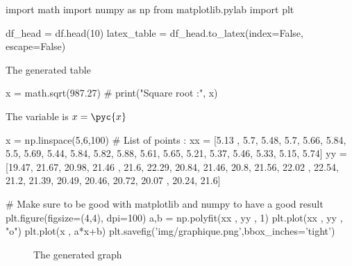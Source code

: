 \documentclass[11pt]{article}%
\begin{document}
\begin{pycode}
import math
import numpy as np
from matplotlib.pylab import plt    
\end{pycode}


\begin{pycode}
df_head = df.head(10)
latex_table = df_head.to_latex(index=False, escape=False)
\end{pycode}
    
\begin{table}
\centering
{}
\caption{The generated table}
\end{table}


\begin{pycode}
x = math.sqrt(987.27)
# print("Square root :",  x)
\end{pycode}

\vspace{5em}

The variable is $x=\pyc{x}$


\begin{pycode}
x = np.linspace(5,6,100)
# List of points :
xx = [5.13 , 5.7, 5.48, 5.7, 5.66, 5.84, 5.5, 5.69, 5.44, 5.84, 5.82, 5.88, 5.61, 5.65, 5.21, 5.37, 5.46, 5.33, 5.15, 5.74]
yy = [19.47, 21.67, 20.98, 21.46 , 21.6, 22.29, 20.84, 21.46, 20.8, 21.56, 22.02 , 22.54, 21.2, 21.39, 20.49, 20.46, 20.72, 20.07 , 20.24, 21.6]

# Make sure to be good with matplotlib and numpy to have a good result
plt.figure(figsize=(4,4), dpi=100)
a,b = np.polyfit(xx , yy , 1)
plt.plot(xx , yy , "o")
plt.plot(x , a*x+b)
plt.savefig('img/graphique.png',bbox_inches='tight')
\end{pycode}

\begin{figure}
    \caption{The generated graph}
\end{figure}
\end{document}
